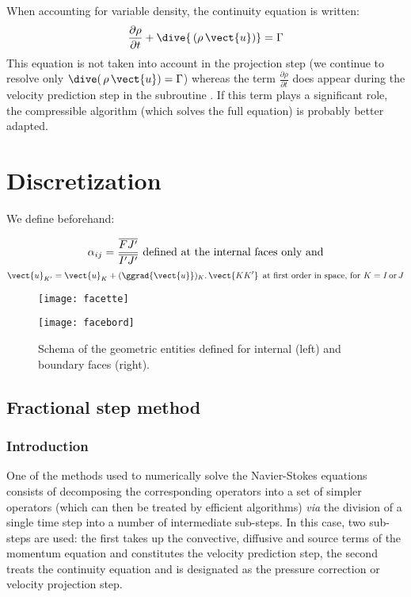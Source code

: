 When accounting for variable density, the continuity equation is written:
$$\frac{\partial \rho}{\partial t} + \dive{\,(\rho\,\vect{u})} = \Gamma  $$
This equation is not taken into account in the projection step
(we continue to resolve only $\displaystyle \dive(\,{\rho\,\vect{u}}) = \Gamma$)
whereas the term $\displaystyle \frac{\partial \rho}{\partial t}$ does
appear during the velocity prediction step in the subroutine .
If this term plays a significant role, the \CS compressible algorithm
(which solves the full equation) is probably better adapted.

\section*{Discretization}

We define beforehand:

\begin{equation}\notag
\displaystyle\alpha_{ij}=\frac{\overline{FJ'}}{\overline{I'J'}} \text{\ defined  at the internal faces only and}
\end{equation}
\begin{equation}\notag
\vect{u}_{K'} = \vect{u}_{K}+(\ggrad{\vect{u}})_K\text{.}\, \vect{KK'}\, \text{\
at first order in space, for ${K = I \,\text{or}\, J}$}
\end{equation}

\begin{figure}[h]
\hspace*{1cm}\parbox{8cm}{%
\centerline{\texttt{[image: facette]}}}
\parbox{8cm}{%
\centerline{\texttt{[image: facebord]}}}
\caption{\label{Base_Navstv_fig_geom}Schema of the geometric entities defined for
internal (left) and boundary faces (right).}
\end{figure}

\subsection*{\bf Fractional step method}
\subsubsection*{\bf Introduction}
One of the methods used to numerically solve the Navier-Stokes equations
consists of decomposing the corresponding operators into a set of simpler
operators (which can then be treated by efficient algorithms) {\it via}
the division of a single time step into a number of intermediate sub-steps.
In this case, two sub-steps are used: the first takes up the convective,
diffusive and source terms of the momentum equation and constitutes the
velocity prediction step, the second treats the continuity equation and
is designated as the pressure correction or velocity projection step.

